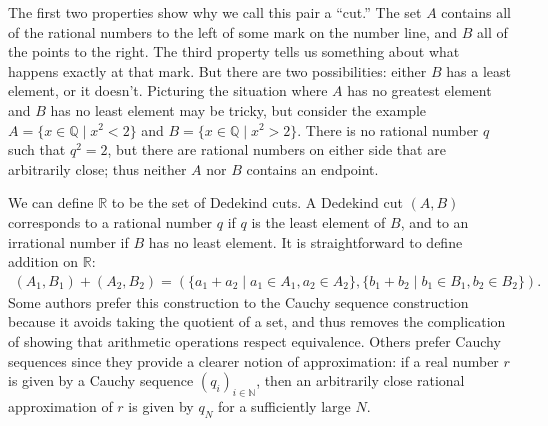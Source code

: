 \documentclass[letterpaper,10pt,english]{sphinxmanual}
\begin{document}
\sphinxAtStartPar
The first two properties show why we call this pair a “cut.” The set \(A\) contains all of the rational numbers to the left of some mark on the number line, and \(B\) all of the points to the right. The third property tells us something about what happens exactly at that mark. But there are two possibilities: either \(B\) has a least element, or it doesn’t. Picturing the situation where \(A\) has no greatest element and \(B\) has no least element may be tricky, but consider the example \(A = \{x \in \mathbb{Q} \mid x^2 < 2\}\) and \(B = \{x \in \mathbb{Q} \mid x^2 > 2\}\). There is no rational number \(q\) such that \(q^2 = 2\), but there are rational numbers on either side that are arbitrarily close; thus neither \(A\) nor \(B\) contains an endpoint.

\sphinxAtStartPar
We can define \(\mathbb{R}\) to be the set of Dedekind cuts. A Dedekind cut \((A, B)\) corresponds to a rational number \(q\) if \(q\) is the least element of \(B\), and to an irrational number if \(B\) has no least element. It is straightforward to define addition on \(\mathbb{R}\):
\begin{equation*}
\begin{split}(A_1, B_1) + (A_2, B_2) = ( \{a_1 + a_2 \mid a_1 \in A_1, a_2 \in A_2 \}, \{b_1 + b_2 \mid b_1 \in B_1, b_2 \in B_2 \} ).\end{split}
\end{equation*}
\sphinxAtStartPar
Some authors prefer this construction to the Cauchy sequence construction because it avoids taking the quotient of a set, and thus removes the complication of showing that arithmetic operations respect equivalence. Others prefer Cauchy sequences since they provide a clearer notion of approximation: if a real number \(r\) is given by a Cauchy sequence \((q_i)_{i \in \mathbb{N}}\), then an arbitrarily close rational approximation of \(r\) is given by \(q_N\) for a sufficiently large \(N\).
\end{document}
